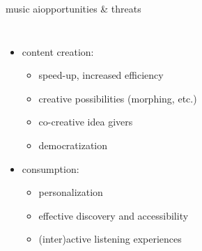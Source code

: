 
\begin{frame}{music ai}{opportunities \& threats}
    \vspace{-3mm}
    \begin{columns}
    
        \begin{itemize}
            \item content creation:
                \begin{itemize}
                    \item speed-up, increased efficiency
                    \item creative possibilities (morphing, etc.)
                    \item co-creative idea givers
                    \item democratization
                \end{itemize}
            \smallskip
            \item consumption:
                \begin{itemize}
                    \item personalization
                    \item effective discovery and accessibility
                    \item (inter)active listening experiences
                \end{itemize}
        \end{itemize}
    

\end{columns}
\end{frame}
